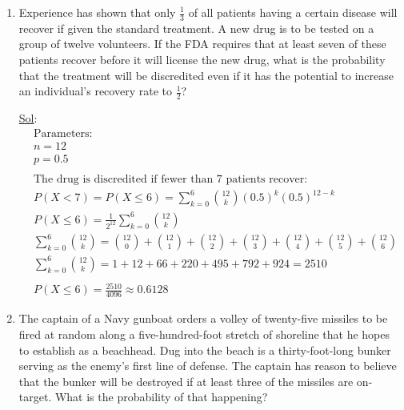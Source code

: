 \begin{enumerate}
  \item[12.] Experience has shown that only \(\frac{1}{3}\) of all
    patients having a certain disease will recover if given the
    standard treatment. A new drug is to be tested on a group of
    twelve volunteers. If the FDA requires that at least seven of
    these patients recover before it will license the new drug, what
    is the probability that the treatment will be discredited even if
    it has the potential to increase an individual’s recovery rate to
    \(\frac{1}{2}\)?

    \underline{Sol}:\\
    $$
    \begin{aligned}
      & \text{Parameters: } \\
      & n = 12 \\
      & p = 0.5 \\
      \\
      & \text{The drug is discredited if fewer than 7 patients recover: } \\
      & P(X < 7) = P(X \le 6) = \sum_{k=0}^{6} \binom{12}{k} (0.5)^k
      (0.5)^{12-k} \\
      & P(X \le 6) = \frac{1}{2^{12}} \sum_{k=0}^{6} \binom{12}{k} \\
      & \sum_{k=0}^{6} \binom{12}{k} = \binom{12}{0} + \binom{12}{1}
      + \binom{12}{2} + \binom{12}{3} + \binom{12}{4} + \binom{12}{5}
      + \binom{12}{6} \\
      & \sum_{k=0}^{6} \binom{12}{k} = 1 + 12 + 66 + 220 + 495 + 792
      + 924 = 2510 \\
      \\
      & P(X \le 6) = \frac{2510}{4096} \approx \boxed{0.6128}
    \end{aligned}$$

  \item[14.] The captain of a Navy gunboat orders a volley of
    twenty-five missiles to be fired at random along a
    five-hundred-foot stretch of shoreline that he hopes to establish
    as a beachhead. Dug into the beach is a thirty-foot-long bunker
    serving as the enemy’s first line of defense. The captain has
    reason to believe that the bunker will be destroyed if at least
    three of the missiles are on-target. What is the probability of
    that happening?


\end{enumerate}
